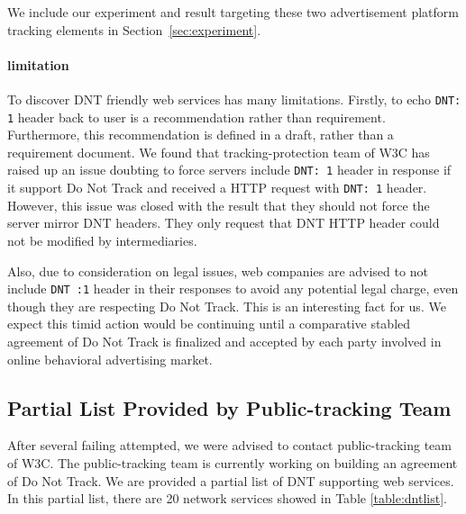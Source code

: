 \documentclass{sig-alternate}
\begin{document}
We include our experiment and result targeting these two advertisement platform tracking elements in Section~\ref{sec:experiment}. 

\paragraph{limitation}
To discover DNT friendly web services has many limitations. Firstly, to echo \verb|DNT: 1| header back to user is a recommendation rather than requirement. Furthermore, this recommendation is defined in a draft\cite{dntdraft}, rather than a requirement document. We found that tracking-protection team of W3C has raised up an issue doubting to force servers include \verb|DNT: 1| header in response if it support Do Not Track and received a HTTP request with \verb|DNT: 1| header. However, this issue was closed with the result that they should not force the server mirror DNT headers. They only request that DNT HTTP header could not be modified by intermediaries.

Also, due to consideration on legal issues, web companies are advised to not include \verb|DNT :1| header in their responses to avoid any potential legal charge, even though they are respecting Do Not Track. This is an interesting fact for us. We expect this timid action would be continuing until a comparative stabled agreement of Do Not Track is finalized and accepted by each party involved in online behavioral advertising market.

\subsection{Partial List Provided by Public-tracking Team}

After several failing attempted, we were advised to contact public-tracking team of W3C. The public-tracking team is currently working on building an agreement of Do Not Track. We are provided a partial list of DNT supporting web services. In this partial list, there are 20 network services showed in Table \ref{table:dntlist}.
\end{document}
